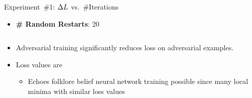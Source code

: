 \begin{frame}{Experiment~\#1: $\Delta L$ vs.\ \#Iterations}
  \begin{itemize}[<+->]
    \item \textbf{\# Random Restarts}: 20
  \end{itemize}

  \begin{columns}
    \begin{column}{0.23\textwidth}
      \begin{center}
      \end{center}
    \end{column}
    \begin{column}{0.2\textwidth}
      \begin{center}
      \end{center}
    \end{column}
    \begin{column}{0.21\textwidth}
      \begin{center}
      \end{center}
    \end{column}
    \begin{column}{0.22\textwidth}
      \begin{center}
      \end{center}
    \end{column}
  \end{columns}
  \vfill
  \begin{itemize}[<+->]
    \item Adversarial training significantly reduces loss on adversarial examples.
    \item Loss values are \textbf{}
      \begin{itemize}
        \item Echoes folklore belief neural network training possible since many local minima with similar loss values
      \end{itemize}
  \end{itemize}
\end{frame}


